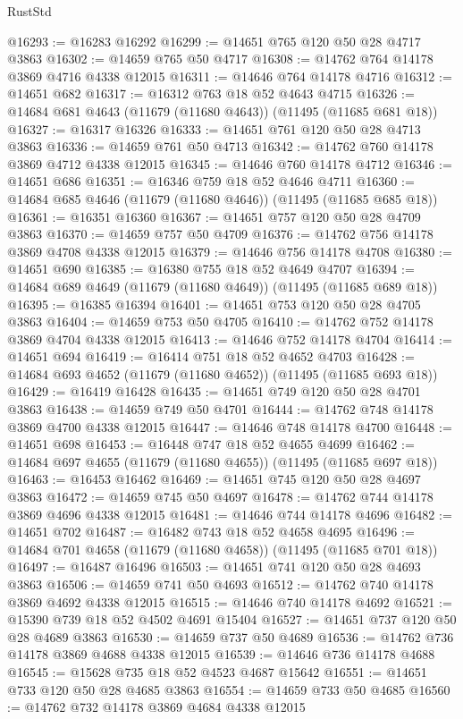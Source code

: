 \begin{lexlean}{RustStd}
\begin{coremodule}
@16293 := @16283 @16292
@16299 := @14651 @765 @120 @50 @28 @4717 @3863
@16302 := @14659 @765 @50 @4717
@16308 := @14762 @764 @14178 @3869 @4716 @4338 @12015
@16311 := @14646 @764 @14178 @4716
@16312 := @14651 @682
@16317 := @16312 @763 @18 @52 @4643 @4715
@16326 := @14684 @681 @4643 (@11679 (@11680 @4643)) (@11495 (@11685 @681 @18))
@16327 := @16317 @16326
@16333 := @14651 @761 @120 @50 @28 @4713 @3863
@16336 := @14659 @761 @50 @4713
@16342 := @14762 @760 @14178 @3869 @4712 @4338 @12015
@16345 := @14646 @760 @14178 @4712
@16346 := @14651 @686
@16351 := @16346 @759 @18 @52 @4646 @4711
@16360 := @14684 @685 @4646 (@11679 (@11680 @4646)) (@11495 (@11685 @685 @18))
@16361 := @16351 @16360
@16367 := @14651 @757 @120 @50 @28 @4709 @3863
@16370 := @14659 @757 @50 @4709
@16376 := @14762 @756 @14178 @3869 @4708 @4338 @12015
@16379 := @14646 @756 @14178 @4708
@16380 := @14651 @690
@16385 := @16380 @755 @18 @52 @4649 @4707
@16394 := @14684 @689 @4649 (@11679 (@11680 @4649)) (@11495 (@11685 @689 @18))
@16395 := @16385 @16394
@16401 := @14651 @753 @120 @50 @28 @4705 @3863
@16404 := @14659 @753 @50 @4705
@16410 := @14762 @752 @14178 @3869 @4704 @4338 @12015
@16413 := @14646 @752 @14178 @4704
@16414 := @14651 @694
@16419 := @16414 @751 @18 @52 @4652 @4703
@16428 := @14684 @693 @4652 (@11679 (@11680 @4652)) (@11495 (@11685 @693 @18))
@16429 := @16419 @16428
@16435 := @14651 @749 @120 @50 @28 @4701 @3863
@16438 := @14659 @749 @50 @4701
@16444 := @14762 @748 @14178 @3869 @4700 @4338 @12015
@16447 := @14646 @748 @14178 @4700
@16448 := @14651 @698
@16453 := @16448 @747 @18 @52 @4655 @4699
@16462 := @14684 @697 @4655 (@11679 (@11680 @4655)) (@11495 (@11685 @697 @18))
@16463 := @16453 @16462
@16469 := @14651 @745 @120 @50 @28 @4697 @3863
@16472 := @14659 @745 @50 @4697
@16478 := @14762 @744 @14178 @3869 @4696 @4338 @12015
@16481 := @14646 @744 @14178 @4696
@16482 := @14651 @702
@16487 := @16482 @743 @18 @52 @4658 @4695
@16496 := @14684 @701 @4658 (@11679 (@11680 @4658)) (@11495 (@11685 @701 @18))
@16497 := @16487 @16496
@16503 := @14651 @741 @120 @50 @28 @4693 @3863
@16506 := @14659 @741 @50 @4693
@16512 := @14762 @740 @14178 @3869 @4692 @4338 @12015
@16515 := @14646 @740 @14178 @4692
@16521 := @15390 @739 @18 @52 @4502 @4691 @15404
@16527 := @14651 @737 @120 @50 @28 @4689 @3863
@16530 := @14659 @737 @50 @4689
@16536 := @14762 @736 @14178 @3869 @4688 @4338 @12015
@16539 := @14646 @736 @14178 @4688
@16545 := @15628 @735 @18 @52 @4523 @4687 @15642
@16551 := @14651 @733 @120 @50 @28 @4685 @3863
@16554 := @14659 @733 @50 @4685
@16560 := @14762 @732 @14178 @3869 @4684 @4338 @12015

\end{coremodule}
\end{lexlean}
